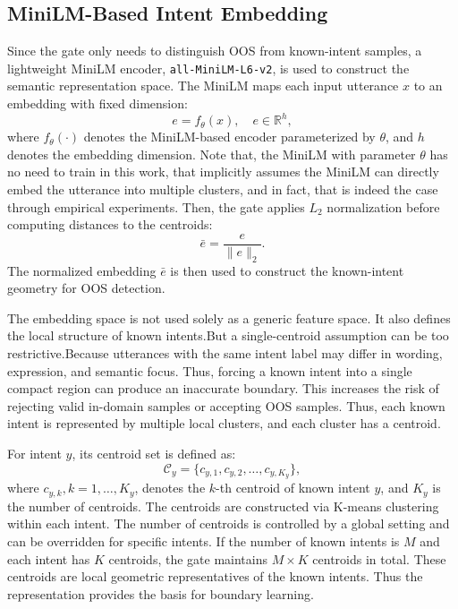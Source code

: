 \documentclass[11pt]{article}
\begin{document}
\subsection{MiniLM-Based Intent Embedding}
Since the gate only needs to distinguish OOS from known-intent samples, a lightweight MiniLM encoder, \texttt{all-MiniLM-L6-v2}, is used to construct the semantic representation space. The MiniLM maps each input utterance $x$ to an embedding with fixed dimension:
\begin{equation}
e = f_{\theta}(x),\quad e \in \mathbb{R}^{h},
\label{eq: embed}
\end{equation}
where $f_{\theta}(\cdot)$ denotes the MiniLM-based encoder parameterized by $\theta$, and $h$ denotes the embedding dimension. Note that, the MiniLM with parameter $\theta$ has no need to train in this work, that implicitly assumes the MiniLM can directly embed the utterance into multiple clusters, and in fact, that is indeed the case through empirical experiments. Then, the gate applies $L_2$ normalization before computing distances to the centroids:
\begin{equation}
\bar{e} = \frac{e}{\|e\|_2}.
\end{equation}
The normalized embedding $\bar{e}$ is then used to construct the known-intent geometry for OOS detection.
    
The embedding space is not used solely as a generic feature space. It also defines the local structure of known intents.But a single-centroid assumption can be too restrictive.Because utterances with the same intent label may differ in wording, expression, and semantic focus. Thus, forcing a known intent into a single compact region can produce an inaccurate boundary. This increases the risk of rejecting valid in-domain samples or accepting OOS samples. Thus, each known intent is represented by multiple local clusters, and each cluster has a centroid.

For intent $y$, its centroid set is defined as:
\begin{equation}
\mathcal{C}_{y}=\{c_{y,1}, c_{y,2}, \ldots, c_{y,K_y}\},
\label{eq: ky}
\end{equation}
where $c_{y,k}, k=1, \dots, K_y$, denotes the $k$-th centroid of known intent $y$, and $K_y$ is the number of centroids. The centroids are constructed via K-means clustering within each intent. The number of centroids is controlled by a global setting and can be overridden for specific intents. If the number of known intents is $M$ and each intent has $K$ centroids, the gate maintains $M \times K$ centroids in total. These centroids are local geometric representatives of the known intents. Thus the representation provides the basis for boundary learning.
\end{document}
